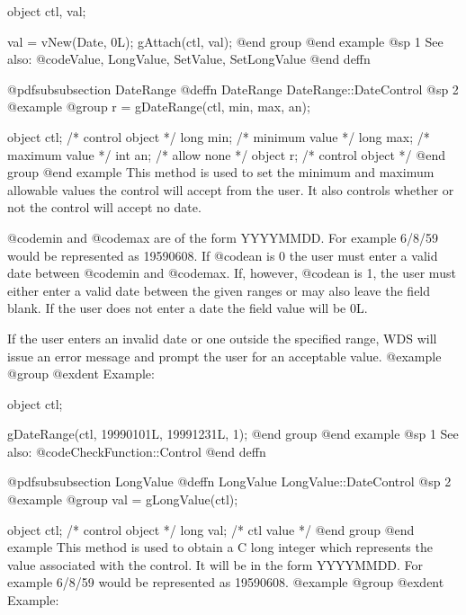 object  ctl, val;

val = vNew(Date, 0L);
gAttach(ctl, val);
@end group
@end example
@sp 1
See also:  @code{Value, LongValue, SetValue, SetLongValue}
@end deffn
















@pdfsubsubsection {DateRange}
@deffn {DateRange} DateRange::DateControl
@sp 2
@example
@group
r = gDateRange(ctl, min, max, an);

object  ctl;   /*  control object  */
long    min;   /*  minimum value   */
long    max;   /*  maximum value   */
int     an;    /*  allow none      */
object  r;     /*  control object  */
@end group
@end example
This method is used to set the minimum and maximum allowable values
the control will accept from the user.  It also controls whether
or not the control will accept no date.

@code{min} and @code{max} are of the form YYYYMMDD.  For example
6/8/59 would be represented as 19590608.  If @code{an} is 0
the user must enter a valid date between @code{min} and @code{max}.
If, however, @code{an} is 1, the user must either enter a valid
date between the given ranges or may also leave the field blank.
If the user does not enter a date the field value will be 0L.

If the user enters an invalid date or one outside the specified range,
WDS will issue an error message and prompt the user for an acceptable
value.
@example
@group
@exdent Example:

object  ctl;

gDateRange(ctl, 19990101L, 19991231L, 1);
@end group
@end example
@sp 1
See also:  @code{CheckFunction::Control}
@end deffn








@pdfsubsubsection {LongValue}
@deffn {LongValue} LongValue::DateControl
@sp 2
@example
@group
val = gLongValue(ctl);

object  ctl;   /*  control object  */
long    val;   /*  ctl value       */
@end group
@end example
This method is used to obtain a C long integer which represents the
value associated with the control.  It will be in the form YYYYMMDD.
For example 6/8/59 would be represented as 19590608.
@example
@group
@exdent Example:

